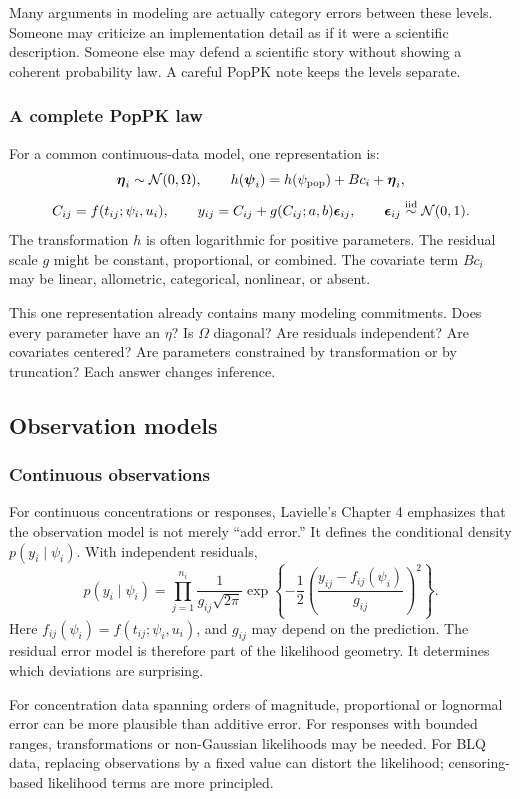 Many arguments in modeling are actually category errors between these levels.  Someone may criticize an implementation detail as if it were a scientific description.  Someone else may defend a scientific story without showing a coherent probability law.  A careful PopPK note keeps the levels separate.

\subsubsection*{A complete PopPK law}

For a common continuous-data model, one representation is:
\[
  \boldsymbol{\eta}_i\sim\mathcal{N}(0,\Omega),
  \qquad
  h(\boldsymbol{\psi}_i)=h(\psi_{\mathrm{pop}})+B c_i+\boldsymbol{\eta}_i,
\]
\[
  C_{ij}=f(t_{ij};\psi_i,u_i),
  \qquad
  y_{ij}=C_{ij}+g(C_{ij};a,b)\boldsymbol{\epsilon}_{ij},
  \qquad
  \boldsymbol{\epsilon}_{ij}\overset{\mathrm{iid}}{\sim}\mathcal{N}(0,1).
\]
The transformation \(h\) is often logarithmic for positive parameters.  The residual scale \(g\) might be constant, proportional, or combined.  The covariate term \(Bc_i\) may be linear, allometric, categorical, nonlinear, or absent.

This one representation already contains many modeling commitments.  Does every parameter have an \(\eta\)?  Is \(\Omega\) diagonal?  Are residuals independent?  Are covariates centered?  Are parameters constrained by transformation or by truncation?  Each answer changes inference.

\subsection{Observation models}

\subsubsection*{Continuous observations}

For continuous concentrations or responses, Lavielle's Chapter 4 emphasizes that the observation model is not merely ``add error.''  It defines the conditional density \(p(y_i\mid\psi_i)\).  With independent residuals,
\[
  p(y_i\mid\psi_i)
  =
  \prod_{j=1}^{n_i}
  \frac{1}{g_{ij}\sqrt{2\pi}}
  \exp\left\{
    -\frac{1}{2}
    \left(\frac{y_{ij}-f_{ij}(\psi_i)}{g_{ij}}\right)^2
  \right\}.
\]
Here \(f_{ij}(\psi_i)=f(t_{ij};\psi_i,u_i)\), and \(g_{ij}\) may depend on the prediction.  The residual error model is therefore part of the likelihood geometry.  It determines which deviations are surprising.

For concentration data spanning orders of magnitude, proportional or lognormal error can be more plausible than additive error.  For responses with bounded ranges, transformations or non-Gaussian likelihoods may be needed.  For BLQ data, replacing observations by a fixed value can distort the likelihood; censoring-based likelihood terms are more principled.

